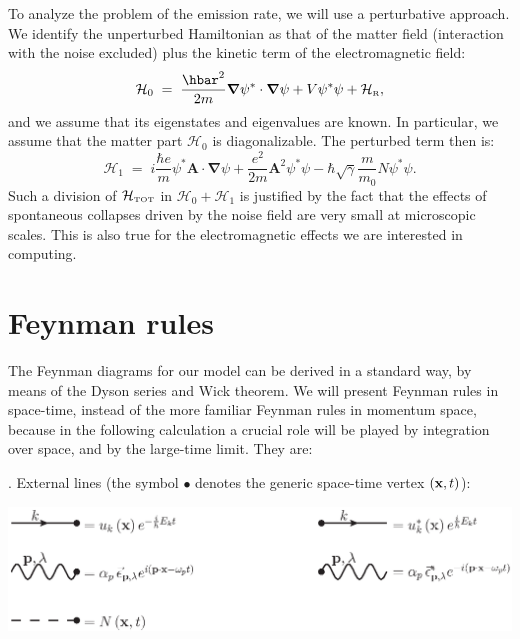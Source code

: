 \documentclass[12pt,onecolumn,amssymb,nofootinbib]{revtex4-2} %
\newcommand*{\boldvec}[1]{\ensuremath{\boldsymbol{#1}}}%
\let\vec\boldvec%
\begin{document}
To analyze the problem of the emission rate, we will use a perturbative
approach. We identify the unperturbed Hamiltonian as that of the matter field
(interaction with the noise excluded) plus the kinetic term of the
electromagnetic field:
\begin{equation}
\mathcal{H}_{0} \; = \;  \frac{\hbar^{2}}{2m} \vec{\nabla}\psi^{*}\cdot\vec{\nabla}\psi
+ V\psi^{*}\psi + {\mathcal H}_{\text{\tiny R}},
\end{equation}
and we assume that its eigenstates and eigenvalues are known. In particular, we
assume that the matter part $\mathcal{H}_{0}$ is diagonalizable. The perturbed
term then is:
\begin{equation} \label{eq:dsgfdj}
\mathcal{H}_{1} \; = \; i\frac{\hbar e}{m} \psi^{*}\mathbf{A}\cdot\vec{\nabla}\psi
+ \frac{e^{2}}{2m}\mathbf{A}^{2}\psi^{*}\psi - \hbar \sqrt{\gamma} \frac{m}{m_{0}}
N\psi^{*}\psi.
\end{equation}
Such a division of ${\mathcal H}_{\text{\tiny TOT}}$ in $\mathcal{H}_{0} +
\mathcal{H}_{1}$ is justified by the fact that the effects of spontaneous
collapses driven by the noise field are very small at microscopic scales. This
is also true for the electromagnetic effects we are interested in computing.


\section{Feynman rules}

The Feynman diagrams for our model can be derived in a standard way, by means
of the Dyson series and Wick theorem. We will present Feynman rules in space-time, instead of the more familiar Feynman rules in momentum space, because in the following calculation a crucial role will be played by integration over space, and by the large-time limit. They are:

. External lines (the symbol $\bullet$ denotes the generic
space-time vertex $({\bf x}, t)$):

\begin{center}
\includegraphics[width=14cm, keepaspectratio]{rules.eps}
\end{center}
\end{document}
